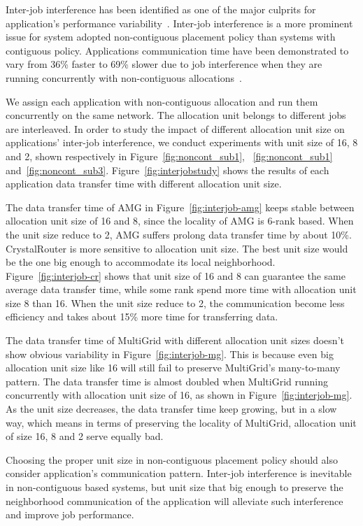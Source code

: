 Inter-job interference has been identified as one of the major culprits 
for application's performance variability~\cite{abhinav-sc13,skinner}. 
Inter-job interference is a more prominent issue for system adopted 
non-contiguous placement policy than systems with contiguous policy. 
Applications communication time have been demonstrated to 
vary from 36\% faster to 69\% slower due to job interference 
when they are running concurrently with non-contiguous allocations~\cite{abhinav-sc13}.

We assign each application with non-contiguous allocation and 
run them concurrently on the same network. 
The allocation unit belongs to different jobs are interleaved. 
In order to study the impact of different allocation unit size on 
applications' inter-job interference, 
we conduct experiments with unit size of 16, 8 and 2, 
shown respectively in Figure~\ref{fig:noncont_sub1}, 
~\ref{fig:noncont_sub1} and~\ref{fig:noncont_sub3}. 
Figure~\ref{fig:interjobstudy} shows the results of each application 
data transfer time with different allocation unit size. 

The data transfer time of AMG in Figure~\ref{fig:interjob-amg} keeps stable 
between allocation unit size of 16 and 8, since the locality of AMG is 6-rank based. 
When the unit size reduce to 2, AMG suffers prolong data transfer time by about 10\%. 
CrystalRouter is more sensitive to allocation unit size. 
The best unit size would be the one big enough to accommodate its local neighborhood. 
Figure~\ref{fig:interjob-cr} shows that unit size of 16 and 8 can guarantee 
the same average data transfer time, 
while some rank spend more time with allocation unit size 8 than 16. 
When the unit size reduce to 2, the communication become less efficiency 
and takes about 15\% more time for transferring data. 

The data transfer time of MultiGrid with different allocation unit sizes 
doesn't show obvious variability in Figure~\ref{fig:interjob-mg}. 
This is because even big allocation unit size like 16 will still fail to preserve MultiGrid's many-to-many pattern. 
The data transfer time is almost doubled when MultiGrid running concurrently with allocation unit size of 16, 
as shown in Figure~\ref{fig:interjob-mg}. 
As the unit size decreases, the data transfer time keep growing, 
but in a slow way, which means in terms of preserving the locality of MultiGrid, 
allocation unit of size 16, 8 and 2 serve equally bad.

Choosing the proper unit size in non-contiguous placement policy should 
also consider application's communication pattern. 
Inter-job interference is inevitable in non-contiguous based systems, 
but unit size that big enough to preserve the neighborhood communication of the application 
will alleviate such interference and improve job performance. 



